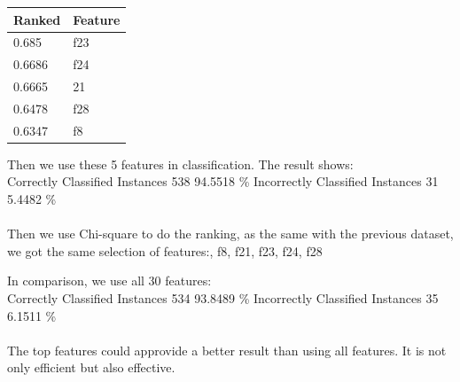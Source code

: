 \documentclass[11pt, a4paper, oneside, openright]{article}
\begin{document}
\begin{table}[H]
\centering
\begin{tabular}{|l|l|}
\hline
\multicolumn{1}{|c|}{\textbf{Ranked}} & \multicolumn{1}{c|}{\textbf{Feature}} \\
\hline
0.685    &f23                                     \\
\hline
0.6686    &f24                                \\
\hline
0.6665  &21                                             \\
\hline
0.6478   &f28                                             \\
\hline
0.6347   &f8                                            \\
\hline
\end{tabular}
\end{table}

Then we use these 5 features in classification.
The result shows:
\\
\newline Correctly Classified Instances    \hspace * {4mm}     538    \hspace * {4mm}           94.5518 \%
\newline Incorrectly Classified Instances  \hspace * {4mm}      31     \hspace * {4mm}           5.4482 \%
\\
\\
Then we use Chi-square to do the ranking, as the same with the previous dataset, we got the same selection of features:, f8, f21, f23, f24, f28


In comparison, we use all 30 features:
\\
\newline Correctly Classified Instances    \hspace * {4mm}     534      \hspace * {4mm}         93.8489 \%
\newline Incorrectly Classified Instances   \hspace * {4mm}     35       \hspace * {4mm}         6.1511 \%
\\
\\
The top features could approvide a better result than using all features. It is not only efficient but also effective.
\end{document}
